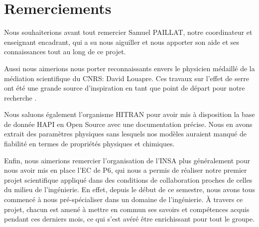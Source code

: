 \documentclass[a4paper, 12pt]{report} %
\begin{document}
\newpage
\chapter*{Remerciements} 

\setlength{\parindent}{30pt}

\indent Nous souhaiterions avant tout remercier Samuel PAILLAT, notre
coordinateur et enseignant encadrant, qui a su nous aiguiller
et nous apporter son aide et ses connaissances tout au long
de ce projet. \vspace{\baselineskip}

	Aussi nous aimerions nous porter reconnaissants 
envers le physicien médaillé de la médiation scientifique
du CNRS: David Louapre. Ces travaux sur l'effet de serre 
ont été une grande source d'inspiration en tant que point
de départ pour notre recherche . 
\vspace{\baselineskip}

\indent Nous saluons également l'organisme HITRAN  
pour avoir mis à disposition la base de donnée HAPI en Open Source avec une documentation 
précise. Nous en avons extrait des paramètres physiques sans lesquels nos modèles auraient 
manqué de fiabilité en termes de propriétés physiques et chimiques. \vspace{\baselineskip}

\indent Enfin, nous aimerions remercier l'organisation de 
l'INSA plus généralement pour nous avoir mis en place l'EC de P6,
qui nous a permis de réaliser notre premier projet
scientifique appliqué dans des conditions de collaboration
proches de celles du milieu de l'ingénierie. 
En effet, depuis le début de ce semestre, nous avons tous commencé à 
nous pré-spécialiser dans un domaine de l'ingénierie. À travers 
ce projet, chacun est amené à mettre en commun ses savoirs et 
compétences acquis pendant ces derniers mois, ce qui s'est avéré être 
enrichissant pour tout le groupe.
\end{document}
